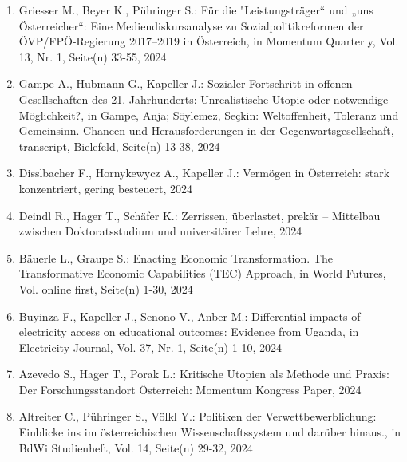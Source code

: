 \begin{enumerate}
	 \item Griesser M., Beyer K., Pühringer S.: Für die "Leistungsträger“ und „uns Österreicher“: Eine Mediendiskursanalyse zu Sozialpolitikreformen der ÖVP/FPÖ-Regierung 2017–2019 in Österreich, in Momentum Quarterly, Vol. 13, Nr. 1, Seite(n) 33-55, 2024
	 \item Gampe A., Hubmann G., Kapeller J.: Sozialer Fortschritt in offenen Gesellschaften des 21. Jahrhunderts: Unrealistische Utopie oder notwendige Möglichkeit?, in Gampe, Anja; Söylemez, Seçkin: Weltoffenheit, Toleranz und Gemeinsinn. Chancen und Herausforderungen in der Gegenwartsgesellschaft, transcript, Bielefeld, Seite(n) 13-38, 2024
	 \item Disslbacher F., Hornykewycz A., Kapeller J.: Vermögen in Österreich: stark konzen­triert, gering be­steuert, 2024
	 \item Deindl R., Hager T., Schäfer K.: Zerrissen, überlastet, prekär – Mittelbau zwischen Doktoratsstudium und universitärer Lehre, 2024
	 \item Bäuerle L., Graupe S.: Enacting Economic Transformation. The Transformative Economic Capabilities (TEC) Approach, in World Futures, Vol. online first, Seite(n) 1-30, 2024
	 \item Buyinza F., Kapeller J., Senono V., Anber M.: Differential impacts of electricity access on educational outcomes: Evidence from Uganda, in Electricity Journal, Vol. 37, Nr. 1, Seite(n) 1-10, 2024
	 \item Azevedo S., Hager T., Porak L.: Kritische Utopien als Methode und Praxis: Der Forschungsstandort Österreich: Momentum Kongress Paper, 2024
	 \item Altreiter C., Pühringer S., Völkl Y.: Politiken der Verwettbewerblichung: Einblicke ins im österreichischen Wissenschaftssystem und darüber hinaus., in BdWi Studienheft, Vol. 14, Seite(n) 29-32, 2024
\end{enumerate}
